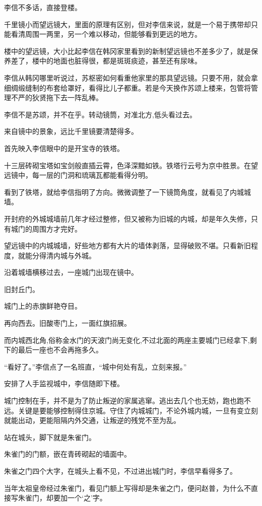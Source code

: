 李信不多话，直接登楼。

千里镜小而望远镜大，里面的原理有区别，但对李信来说，就是一个易于携带却只能看清周围一两里，另一个难以移动，但能够看到更远的地方。

楼中的望远镜，大小比起李信在韩冈家里看到的新制望远镜也不差多少了，就是保养差了，楼中的地面也脏得很，都是斑斑痰迹，甚至还有尿味。

李信从韩冈哪里听说过，苏枢密如何看重他家里的那具望远镜。只要不用，就会拿细绸缎缝制的布套给罩好，看得比儿子都重。若是今天换作苏颂上楼来，包管将管理不严的狄贤拖下去一阵乱棒。

李信不是苏颂，并不在乎。转动镜筒，对准北方,低头看过去。

来自镜中的景象，远比千里镜要清楚得多。

首先映入李信眼中的是开宝寺的铁塔。

十三层砖砌宝塔如宝剑般直插云霄，色泽深黯如铁。铁塔行云号为京中胜景。在望远镜中，每一层的门洞和琉璃瓦都能看得分明。

看到了铁塔，就给李信指明了方向。微微调整了一下镜筒角度，就看见了内城城墙。

开封府的外城城墙前几年才经过整修，但又被称为旧城的内城，却是年久失修，只有城门的周围方才完好。

望远镜中的内城城墙，好些地方都有大片的墙体剥落，显得破败不堪。只看新旧程度，就能分得清内城与外城。

沿着城墙横移过去，一座城门出现在镜中。

旧封丘门。

城门上的赤旗鲜艳夺目。

再向西去。旧酸枣门上，一面红旗招展。

而内城西北角,俗称金水门的天波门尚无变化,不过北面的两座主要城门已经拿下,剩下的最后一座也不会再拖多久。

“看好了。”李信点了一名班直，“城中何处有乱，立刻来报。”

安排了人手监视城中，李信随即下楼。

城门控制在手，并不是为了防止叛逆的家属逃窜。逃出去几个也无妨，跑也跑不远。关键是要能够控制得住京城。守住了内城城门，不论外城内城，一旦有变立刻就能出动，更能阻隔内外交通，让叛逆的残党不至为乱。

站在城头，脚下就是朱雀门。

朱雀门的门额，嵌在青砖砌起的墙面中。

朱雀之门四个大字，在城头上看不见，不过进出城门时，李信早看得多了。

当年太祖皇帝经过朱雀门，看见门额上写得却是朱雀之门，便问赵普，为什么不直接写朱雀门，却要加一个‘之’字。

